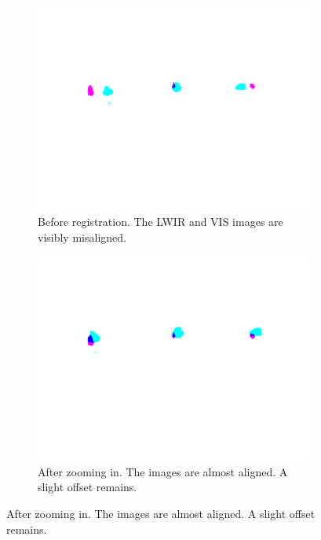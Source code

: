 \documentclass{l4proj}
\begin{document}
\begin{figure}[ht]
  \centering
  \begin{subfigure}[h!]{0.3\textwidth}
    \includegraphics[width=\textwidth, trim={3.5cm 9cm 3.5cm 4.5cm}, clip, frame]{images/registration/unregistered.png}
    \caption{Before registration. The LWIR and VIS images are visibly misaligned.}
  \end{subfigure}
  \begin{subfigure}[h!]{0.3\textwidth}
    \includegraphics[width=\textwidth, trim={3.5cm 9cm 3.5cm 4.5cm}, clip, frame]{images/registration/registered_zoom.png}
    \caption{After zooming in. The images are almost aligned. A slight offset remains.}
  \end{subfigure}

\end{figure}
\end{document}
